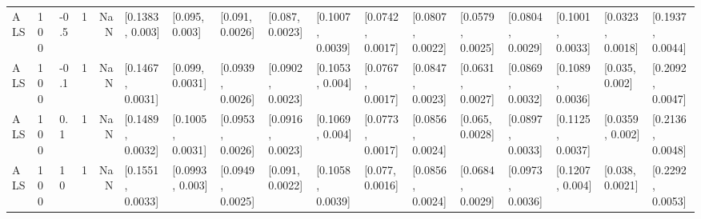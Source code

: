 \begin{tabular}{llllrllllllllllll}
      ALS &  100 &  -0.5 &    1 &   NaN &   [0.1383, 0.003] &    [0.095, 0.003] &   [0.091, 0.0026] &   [0.087, 0.0023] &  [0.1007, 0.0039] &  [0.0742, 0.0017] &  [0.0807, 0.0022] &  [0.0579, 0.0025] &  [0.0804, 0.0029] &  [0.1001, 0.0033] &  [0.0323, 0.0018] &  [0.1937, 0.0044] \\
      ALS &  100 &  -0.1 &    1 &   NaN &  [0.1467, 0.0031] &   [0.099, 0.0031] &  [0.0939, 0.0026] &  [0.0902, 0.0023] &   [0.1053, 0.004] &  [0.0767, 0.0017] &  [0.0847, 0.0023] &  [0.0631, 0.0027] &  [0.0869, 0.0032] &  [0.1089, 0.0036] &    [0.035, 0.002] &  [0.2092, 0.0047] \\
      ALS &  100 &   0.1 &    1 &   NaN &  [0.1489, 0.0032] &  [0.1005, 0.0031] &  [0.0953, 0.0026] &  [0.0916, 0.0023] &   [0.1069, 0.004] &  [0.0773, 0.0017] &  [0.0856, 0.0024] &   [0.065, 0.0028] &  [0.0897, 0.0033] &  [0.1125, 0.0037] &   [0.0359, 0.002] &  [0.2136, 0.0048] \\
      ALS &  100 &    10 &    1 &   NaN &  [0.1551, 0.0033] &   [0.0993, 0.003] &  [0.0949, 0.0025] &   [0.091, 0.0022] &  [0.1058, 0.0039] &   [0.077, 0.0016] &  [0.0856, 0.0024] &  [0.0684, 0.0029] &  [0.0973, 0.0036] &   [0.1207, 0.004] &   [0.038, 0.0021] &  [0.2292, 0.0053] \\
\bottomrule
\end{tabular}
